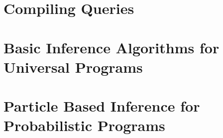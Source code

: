 \section{Compiling Queries}
\label{sec:proginf:comp}

\section{Basic Inference Algorithms for Universal Programs}
\label{sec:proginf:inf}

\section{Particle Based Inference for Probabilistic Programs}
\label{sec:proginf:part}